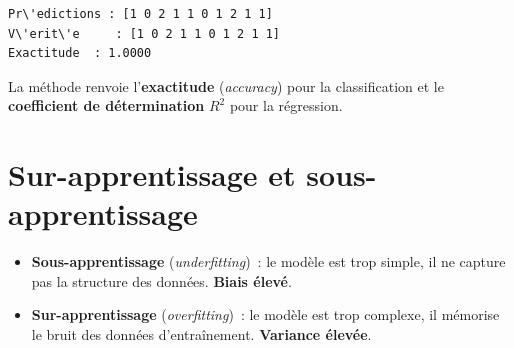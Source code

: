 \begin{codeoutput}
\begin{verbatim}
Pr\'edictions : [1 0 2 1 1 0 1 2 1 1]
V\'erit\'e     : [1 0 2 1 1 0 1 2 1 1]
Exactitude  : 1.0000
\end{verbatim}
\end{codeoutput}

\begin{remarque}
La m\'ethode  renvoie l'\textbf{exactitude} (\textit{accuracy}) pour la classification et le \textbf{coefficient de d\'etermination} $R^2$ pour la r\'egression.
\end{remarque}

\section{Sur-apprentissage et sous-apprentissage}
\label{sec:overfitting}


\begin{definition}
\begin{itemize}
    \item \textbf{Sous-apprentissage} (\textit{underfitting})~: le mod\`ele est trop simple, il ne capture pas la structure des donn\'ees. \textbf{Biais \'elev\'e}.
    \item \textbf{Sur-apprentissage} (\textit{overfitting})~: le mod\`ele est trop complexe, il m\'emorise le bruit des donn\'ees d'entra\^inement. \textbf{Variance \'elev\'ee}.
\end{itemize}
\end{definition}

